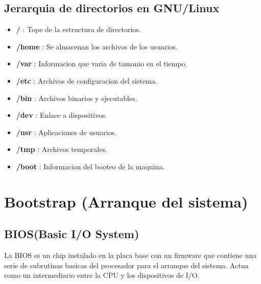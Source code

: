 \documentclass[11pt]{article}
\begin{document}
\subsection{Jerarquia de directorios en GNU/Linux}
\begin{itemize}
    \item \textbf{/} : Tope de la estructura de directorios.
    \item \textbf{/home} : Se almacenan los archivos de los usuarios.
    \item \textbf{/var} : Informacion que varia de tamanio en el tiempo.
    \item \textbf{/etc} : Archivos de configuracion del sistema.
    \item \textbf{/bin} : Archivos binarios y ejecutables.
    \item \textbf{/dev} : Enlace a dispositivos.
    \item \textbf{/usr} : Aplicaciones de usuarios.
    \item \textbf{/tmp} : Archivos temporales.
    \item \textbf{/boot} : Informacion del booteo de la maquina.
\end{itemize}

\section{Bootstrap (Arranque del sistema)}
\subsection{BIOS(Basic I/O System)}
La BIOS es un chip instalado en la placa base con un firmware que contiene una serie de subrutinas basicas del procesador para el arranque del sistema. Actua como un intermediario entre la CPU y los dispositivos de I/O.
\end{document}
